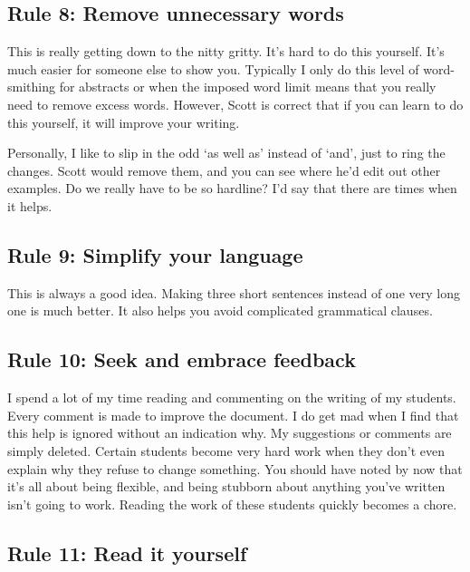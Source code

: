 \documentclass[
]{krantz}
\begin{document}
\hypertarget{rule-8-remove-unnecessary-words}{%
\subsection{Rule 8: Remove unnecessary words}\label{rule-8-remove-unnecessary-words}}

This is really getting down to the nitty gritty. It's hard to do this yourself. It's much easier for someone else to show you. Typically I only do this level of word-smithing for abstracts or when the imposed word limit means that you really need to remove excess words. However, Scott is correct that if you can learn to do this yourself, it will improve your writing.

Personally, I like to slip in the odd `as well as' instead of `and', just to ring the changes. Scott would remove them, and you can see where he'd edit out other examples. Do we really have to be so hardline? I'd say that there are times when it helps.

\hypertarget{rule-9-simplify-your-language}{%
\subsection{Rule 9: Simplify your language}\label{rule-9-simplify-your-language}}

This is always a good idea. Making three short sentences instead of one very long one is much better. It also helps you avoid complicated grammatical clauses.

\hypertarget{rule-10-seek-and-embrace-feedback}{%
\subsection{Rule 10: Seek and embrace feedback}\label{rule-10-seek-and-embrace-feedback}}

I spend a lot of my time reading and commenting on the writing of my students. Every comment is made to improve the document. I do get mad when I find that this help is ignored without an indication why. My suggestions or comments are simply deleted. Certain students become very hard work when they don't even explain why they refuse to change something. You should have noted by now that it's all about being flexible, and being stubborn about anything you've written isn't going to work. Reading the work of these students quickly becomes a chore.

\hypertarget{rule-11-read-it-yourself}{%
\subsection{Rule 11: Read it yourself}\label{rule-11-read-it-yourself}}
\end{document}
